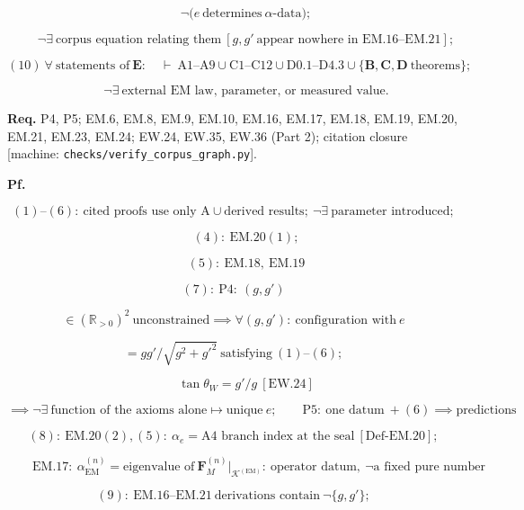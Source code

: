 \begin{theorem}
\[
\qquad \neg\bigl(e\ \text{determines}\ \alpha\text{-data}\bigr);
\]

\[
\qquad \neg\exists\ \text{corpus equation relating them}\ [g,g'\ \text{appear nowhere in EM.16--EM.21}];
\]

\[
(10)\ \forall\ \text{statements of}\ \mathbf E:\quad\vdash\ \mathrm{A1\text{–}A9}\cup\mathrm{C1\text{–}C12}\cup\mathrm{D0.1\text{–}D4.3}\cup\{\mathbf B,\mathbf C,\mathbf D\ \text{theorems}\};
\]

\[
\qquad \neg\exists\ \text{external EM law, parameter, or measured value}.
\]

\textbf{Req.} P4, P5; EM.6, EM.8, EM.9, EM.10, EM.16, EM.17, EM.18, EM.19, EM.20, EM.21, EM.23, EM.24; EW.24, EW.35, EW.36 (Part 2); citation closure [machine: \texttt{checks/\allowbreak{}verify\_\allowbreak{}corpus\_\allowbreak{}graph.py}].

\textbf{Pf.}

\[
(1)\text{--}(6):\ \text{cited proofs use only A}\cup\text{derived results};\ \neg\exists\ \text{parameter introduced};
\]

\[
\qquad (4):\ \mathrm{EM.20}(1);
\]

\[
\qquad (5):\ \mathrm{EM.18},\ \mathrm{EM.19}
\]

\[
(7):\ \mathrm{P4}:\ (g,g')
\]

\[
\in (\mathbb R_{>0})^2\ \text{unconstrained}\implies\forall(g,g'):\ \text{configuration with}\ e
\]

\[
= gg'/\sqrt{g^2+g'^2}\ \text{satisfying}\ (1)\text{--}(6);
\]

\[
\qquad \tan\theta_W=g'/g\ [\mathrm{EW.24}]
\]

\[
\implies\neg\exists\ \text{function of the axioms alone}\mapsto\text{unique}\ e;\qquad\mathrm{P5}:\ \text{one datum}\ +(6)\implies\text{predictions}
\]

\[
(8):\ \mathrm{EM.20}(2),(5):\ \alpha_e=\text{A4 branch index at the seal}\ [\mathrm{Def\text{-}EM.20}];
\]

\[
\qquad \mathrm{EM.17}:\ \alpha_{\mathrm{EM}}^{(n)}=\text{eigenvalue of}\ \mathbf F_M^{(n)}\big|_{\mathcal K^{(\mathrm{EM})}}:\ \text{operator datum},\ \neg\text{a fixed pure number}
\]

\[
(9):\ \mathrm{EM.16}\text{--}\mathrm{EM.21}\ \text{derivations contain}\ \neg\{g,g'\};
\]


\end{theorem}
